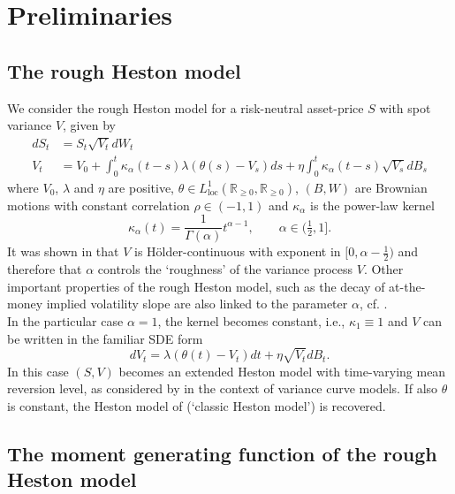 \documentclass[12pt,a4paper]{amsart}
\numberwithin{equation}{section}
\numberwithin{equation}{section}
\theoremstyle{nonumberplain}
\newcommand{\Rplus}{\mathbb{R}_{\geq 0 }}
\begin{document}
\section{Preliminaries}
\subsection{The rough Heston model}

We consider the rough Heston model \cite{eleuch2019characteristic, eleuch2018perfect} for a risk-neutral asset-price $S$ with spot variance $V$, given by
\begin{subequations}\label{eq:rough_Heston}
\begin{align}
dS_t &= S_t \sqrt{V_t} dW_t\\
V_t &= V_0 + \int_0^t \kappa_\alpha(t-s) \lambda(\theta(s) - V_s)ds + \eta \int_0^t \kappa_\alpha(t-s) \sqrt{V_s} dB_s
\end{align}
\end{subequations}
where $V_0$, $\lambda$ and $\eta$ are positive,  $\theta \in L^1_\text{loc}(\Rplus, \Rplus)$, $(B, W)$ are Brownian motions with constant correlation $\rho \in (-1,1)$ and $\kappa_\alpha$ is the power-law kernel
\[\kappa_\alpha(t) = \frac{1}{\Gamma(\alpha)} t^{\alpha-1}, \qquad \alpha \in (\tfrac{1}{2},1].\]
It was shown in \cite[Thm.~2.1]{eleuch2019characteristic} that $V$ is H\"older-continuous with exponent in $[0,\alpha - \tfrac{1}{2})$ and therefore that $\alpha$ controls the `roughness' of the variance process $V$. Other important properties of the rough Heston model, such as the decay of at-the-money implied volatility slope are also linked to the parameter $\alpha$, cf. \cite[Sec.~5.2]{eleuch2019characteristic}.\\
In the particular case $\alpha = 1$, the kernel becomes constant, i.e., $\kappa_1 \equiv 1$ and $V$ can be written in the familiar SDE form
\begin{equation}\label{eq:nonrough_Heston}
dV_t = \lambda (\theta(t) - V_t) dt + \eta \sqrt{V_t} dB_t.
\end{equation}
In this case $(S,V)$ becomes an extended Heston model with time-varying mean reversion level, as considered by \cite[Ex.~3.4]{buehler2006volatility} in the context of variance curve models. If also $\theta$ is constant, the Heston model of \cite{heston1993closed} (`classic Heston model') is recovered.

\subsection{The moment generating function of the rough Heston model}
\end{document}
